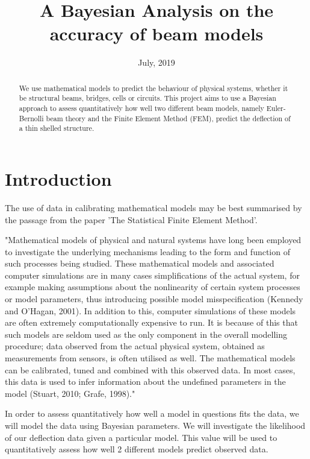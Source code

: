\documentclass{article}
\title{A Bayesian Analysis on the accuracy of beam models}
\date{July, 2019}	%
\begin{document}
\maketitle

\begin{abstract}
	We use mathematical models to predict the behaviour of physical systems, whether it be structural beams, bridges, cells or circuits. This project aims to use a Bayesian approach to assess quantitatively how well two different beam models, namely Euler-Bernolli beam theory and the Finite Element Method (FEM), predict the deflection of a thin shelled structure.
\end{abstract}


\section{Introduction}
The use of data in calibrating mathematical models may be best summarised by the passage from the paper 'The Statistical Finite Element Method'\cite{stat}.
\begin{displayquote}
	"Mathematical models of physical and natural systems have long been employed to investigate the underlying mechanisms leading to the form and function of such processes being studied.  These mathematical models and associated computer simulations are in many cases simplifications of the actual system, for example making assumptions about the nonlinearity of certain system processes or model parameters, thus introducing possible model misspecification (Kennedy and O’Hagan, 2001). In addition to this, computer simulations of these models are often extremely computationally expensive to run. It is because of this that such models are seldom used as the only component in the overall modelling procedure; data observed from the actual physical system, obtained as measurements from sensors, is often utilised as well. The mathematical models can be calibrated, tuned and combined with this observed data. In most cases, this data is used to infer information about the undefined parameters in the model (Stuart, 2010; Grafe, 1998)."
\end{displayquote}

In order to assess quantitatively how well a model in questions fits the data, we will model the data using Bayesian parameters. We will investigate the likelihood of our deflection data given a particular model. This value will be used to quantitatively assess how well 2 different models predict observed data.\\
\end{document}
